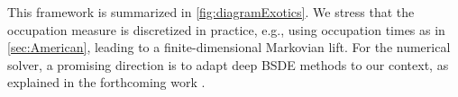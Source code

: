 \documentclass[11pt]{article}
\theoremstyle{plain}
\theoremstyle{definition}
\DeclareMathOperator{\E}{\mathbb{E}}
\DeclareMathOperator{\Q}{\mathbb{Q}}
\DeclareMathOperator{\R}{\mathbb{R}}
\DeclareMathOperator{\calF}{\mathcal{F}}
\DeclareMathOperator{\calO}{\mathcal{O}}
\begin{document}
This framework is summarized in \cref{fig:diagramExotics}. We stress that  the occupation measure is discretized  in practice, e.g., using occupation times as in \cref{sec:American}, leading to a finite-dimensional Markovian lift. For the numerical solver, a promising  direction is to adapt   deep BSDE methods \cite{HanJentzenE1,hure2020deep} to our context, as explained in the forthcoming work \cite{HuangTissotZhang}. 







    

  
\end{document}
